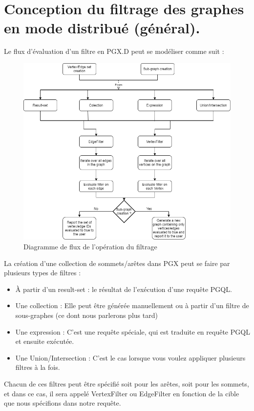\section{Conception du filtrage des graphes en mode distribué (général).}
Le flux d'évaluation d'un filtre en PGX.D peut se modéliser comme suit :
\begin{figure}[H]  
  \centering
    \includegraphics[width=1\textwidth]{chapitre3/Figures/Set-SubGraph-creation.png}
  \caption{Diagramme de flux de l'opération du filtrage}
\end{figure}

La création d'une collection de sommets/arêtes dans PGX peut se faire par plusieurs types de filtres :

\begin{itemize}[label=\textbullet]
\item  À partir d'un result-set : le résultat de l'exécution d'une requête PGQL.
\item  Une collection : Elle peut être générée manuellement ou à partir d'un filtre de sous-graphes (ce dont nous parlerons plus tard)
\item  Une expression : C'est une requête spéciale, qui est traduite en requête PGQL et ensuite exécutée.
\item  Une Union/Intersection : C'est le cas lorsque vous voulez appliquer plusieurs filtres à la fois.
\end{itemize}

Chacun de ces filtres peut être spécifié soit pour les arêtes, soit pour les sommets, et dans ce cas, il sera appelé VertexFilter ou EdgeFilter en fonction de la cible que nous spécifions dans notre requête.\\

